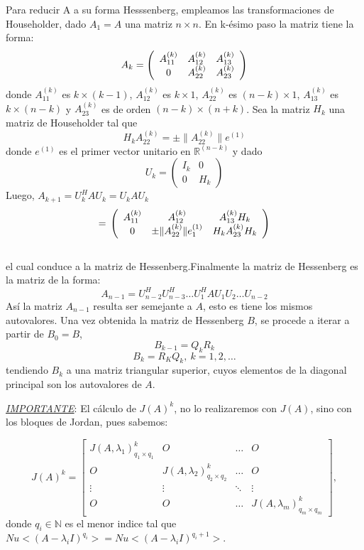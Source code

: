 \documentclass[12pt,a4paper]{article}
\begin{document}
\begin{multicols}{2}
\noindent Para reducir A a su forma Hesssenberg, empleamos las transformaciones de Householder, dado $A_{1}=A$ una matriz $n\times n$. En k-ésimo paso la matriz tiene la forma:\\
$$A_{k}=\left(\begin{array}{c c c}
A_{11}^{(k)} & A_{12}^{(k)} & A_{13}^{(k)} \\
0          & A_{22}^{(k)} & A_{23}^{(k)}
\end{array}\right)$$ donde $A_{11}^{(k)}$ es $k\times (k-1)$, $A_{12}^{(k)}$ es $k\times1$, $A_{22}^{(k)}$ es $(n-k)\times1$, $A_{13}^{(k)}$ es $k\times(n-k)$ y $A_{23}^{(k)}$ es de orden $(n-k)\times(n+k)$. Sea la matriz $H_{k}$ una matriz de Householder tal que $$H_{k}A_{22}^{(k)}=\pm\|A_{22}^{(k)}\|e^{(1)}$$ donde $e^{(1)}$ es el primer vector unitario en $\mathbb{R}^{(n-k)}$
y dado $$U_{k}=\left(\begin{array}{cc}
I_{k}  & 0 \\
0 & H_{k}
\end{array}\right)$$
Luego, $A_{k+1}=U_{k}^{H}AU_{k}=U_{k}AU_{k}$
$$=\newline\left(\begin{array}{c c c}
A_{11}^{(k)}    & A_{12}^{(k)}                  & A_{13}^{(k)}H_{k} \\
0             & \pm\|A_{22}^{(k)}\|e_{1}^{(1)} & H_{k}A_{23}^{(k)}H_{k}
\end{array}\right)$$\\
el cual conduce a la matriz de Hessenberg.Finalmente la matriz de Hessenberg es la matriz de la forma:\\
$$A_{n-1}=U_{n-2}^{H}U_{n-3}^{H}\dots U_{1}^{H}AU_{1}U_{2}\dots U_{n-2}$$
Así la  matriz $A_{n-1}$ resulta ser semejante a $A$, esto es tiene los mismos autovalores. Una vez obtenida la matriz de Hessenberg $B$, se procede a iterar a partir de $B_{0}=B$,$$B_{k-1} = Q_{k}R_{k}$$
$$B_{k}=R_{K}Q_{k}, \  k=1, 2, \dots$$ tendiendo $B_{k}$ a una matriz triangular superior, cuyos elementos de la diagonal principal son los autovalores de $A$.


\end{multicols}

\noindent\textit{\underline{IMPORTANTE}}:
El cálculo de $J(A)^{k}$, no lo realizaremos con $J(A)$, sino con los bloques de Jordan, pues sabemos:

$$
J(A)^k = \begin{bmatrix}
J(A, \lambda_{1})^k_{q_{1}\times q_{1}}&O&\ldots&O\\
O&J(A, \lambda_{2})^k_{q_{2}\times q_{2}}&\ldots&O\\
\vdots&\vdots& \ddots& \vdots\\
O&O&\ldots&J(A, \lambda_{m})^k_{q_{m}\times q_{m}}
\end{bmatrix},
$$
donde $q_{i}\in\mathbb{N}$ es el menor indice tal que $Nu<(A-\lambda_{i}I)^{q_{i}}> = Nu<(A-\lambda_{i}I)^{q_{i}+1}>$.
\end{document}
